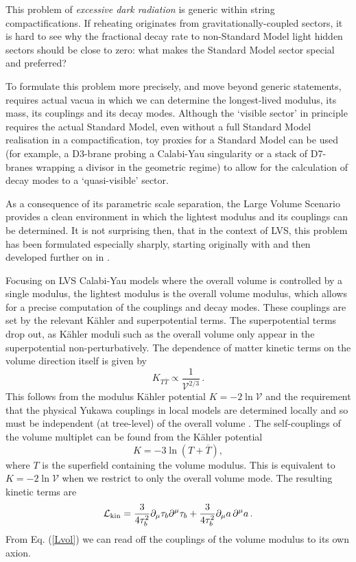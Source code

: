 This problem of \emph{excessive dark radiation} is generic within string compactifications. If reheating originates from gravitationally-coupled sectors, it is hard to see why the fractional decay rate to non-Standard Model light hidden sectors should be close to zero: what makes the Standard Model sector special and preferred?

To formulate this problem more precisely, and move beyond generic statements, requires actual vacua in which we can determine the longest-lived modulus, its mass, its couplings and its decay modes. Although the `visible sector' in principle requires the actual Standard Model, even without a full Standard Model realisation in a compactification, toy proxies for a Standard Model can be used (for example, a D3-brane probing a Calabi-Yau singularity or a stack of D7-branes wrapping a divisor in the geometric regime) to allow for the calculation of decay modes to a `quasi-visible' sector.

As a consequence of its parametric scale separation, the Large Volume Scenario provides a clean environment in which the lightest modulus and its couplings can be determined. It is not surprising then, that in the context of LVS, this problem has been formulated especially sharply, starting originally with \cite{Cicoli:2012aq, 12083563} and then developed further on in 
\cite{12113755, 13041804, 13054128, Allahverdi:2014ppa, Angus:2014bia, 14036810, Cicoli:2015bpq, Cicoli:2018cgu, 210713383, Cicoli:2022fzy, Cicoli:2022uqa}. 

Focusing on LVS Calabi-Yau models where the overall volume is controlled by a single modulus, the lightest modulus is the overall volume modulus, which allows for a precise computation of the couplings and decay modes. These couplings are set by the relevant K\"ahler and superpotential terms. The superpotential terms drop out, as K\"ahler moduli such as the overall volume only appear in the superpotential non-perturbatively. The dependence of matter kinetic terms on the volume direction itself is given by 
\begin{equation}
K_{T\overline{T}} \propto \frac{1}{\mathcal{V}^{2/3}}\,.
\label{matterkahlermetric}
\end{equation}
This follows from the modulus K\"ahler potential $K = - 2 \ln \mathcal{V}$ and the requirement that the physical Yukawa couplings in local models are determined locally and so must be independent (at tree-level) of the overall volume \cite{hepth0609180}. The self-couplings of the volume multiplet can be found from the K\"ahler potential
\begin{equation}
K = - 3 \ln \left( T + \overline{T} \right),
\end{equation}
where $T$ is the superfield containing the volume modulus.
This is equivalent to $K = - 2 \ln \mathcal{V}$ when we restrict to only the overall volume mode. The resulting kinetic terms are
\begin{equation}
\mathcal{L}_{\rm kin} = \frac{3}{4 \tau_b^2} \partial_{\mu} \tau_b \partial^{\mu} \tau_b + \frac{3}{4 \tau_b^2} \partial_{\mu} a\, \partial^{\mu} a\,.
\label{Lvol}
\end{equation}
From Eq. (\ref{Lvol}) we can read off the couplings of the volume modulus to its own axion.

